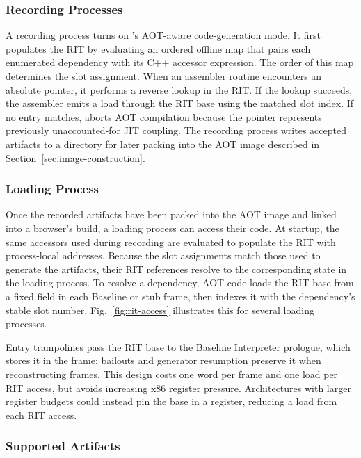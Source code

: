 \documentclass[sigplan,screen,review,anonymous]{acmart}
\newcommand{\AM}{\leavevmode{\sc AmberMonkey}}
\begin{document}
\subsubsection{Recording Processes}

A recording process turns on \AM{}'s AOT-aware code-generation mode. It first populates the RIT by evaluating an ordered offline map that pairs each enumerated dependency with its C++ accessor expression. The order of this map determines the slot assignment. When an assembler routine encounters an absolute pointer, it performs a reverse lookup in the RIT. If the lookup succeeds, the assembler emits a load through the RIT base using the matched slot index. If no entry matches, \AM{} aborts AOT compilation because the pointer represents previously unaccounted-for JIT coupling. The recording process writes accepted artifacts to a directory for later packing into the AOT image described in Section~\ref{sec:image-construction}.

\subsubsection{Loading Process}

Once the recorded artifacts have been packed into the AOT image and linked into a browser's build, a loading process can access their code. At startup, the same accessors used during recording are evaluated to populate the RIT with process-local addresses. Because the slot assignments match those used to generate the artifacts, their RIT references resolve to the corresponding state in the loading process. To resolve a dependency, AOT code loads the RIT base from a fixed field in each Baseline or stub frame, then indexes it with the dependency's stable slot number. Fig.~\ref{fig:rit-access} illustrates this for several loading processes.

Entry trampolines pass the RIT base to the Baseline Interpreter prologue, which stores it in the frame; bailouts and generator resumption preserve it when reconstructing frames. This design costs one word per frame and one load per RIT access, but avoids increasing x86 register pressure. Architectures with larger register budgets could instead pin the base in a register, reducing a load from each RIT access.

\subsubsection{Supported Artifacts}
\end{document}
